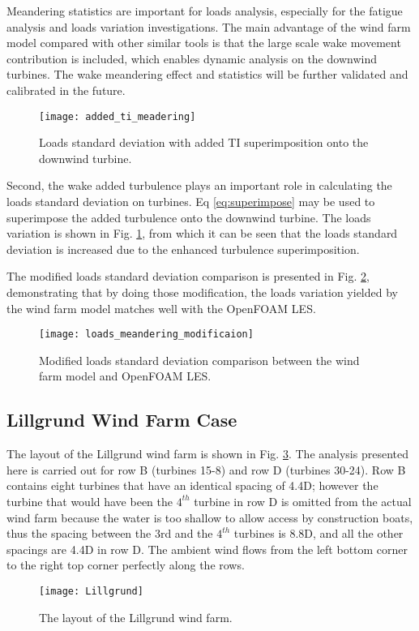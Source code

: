 \documentclass{umthesis}
\begin{document}
Meandering statistics are important for loads analysis, especially for the fatigue analysis and loads variation investigations. The main advantage of the wind farm model compared with other similar tools is that the large scale wake movement contribution is included, which enables dynamic analysis on the downwind turbines. The wake meandering effect and statistics will be further validated and calibrated in the future.

\begin{figure}
  \centering
  \texttt{[image: added\_ti\_meadering]}
  \caption{Loads standard deviation with added TI superimposition onto the downwind turbine.}\label{fig:added_ti_meadering}
\end{figure}

Second, the wake added turbulence plays an important role in calculating the loads standard deviation on turbines. Eq \ref{eq:superimpose} may be used to superimpose the added turbulence onto the downwind turbine. The loads variation is shown in Fig. \ref{fig:added_ti_meadering}, from which it can be seen that the loads standard deviation is increased due to the enhanced turbulence superimposition.

The modified loads standard deviation comparison is presented in Fig. \ref{fig:loads_meandering_modificaion}, demonstrating that by doing those modification, the loads variation yielded by the wind farm model matches well with the OpenFOAM LES.
\begin{figure}
  \centering
  \texttt{[image: loads\_meandering\_modificaion]}
  \caption{Modified loads standard deviation comparison between the wind farm model and OpenFOAM LES.}\label{fig:loads_meandering_modificaion}
\end{figure}



\subsection{Lillgrund Wind Farm Case}
The layout of the Lillgrund wind farm is shown in Fig. \ref{fig:Lillgrund}. The analysis presented here is carried out for row B (turbines 15-8) and row D (turbines 30-24). Row B contains eight turbines that have an identical spacing of 4.4D; however the turbine that would have been the $4^{th}$ turbine in row D is omitted from the actual wind farm because the water is too shallow to allow access by construction boats, thus the spacing between the 3rd and the $4^{th}$ turbines is 8.8D, and all the other spacings are 4.4D in row D. The ambient wind flows from the left bottom corner to the right top corner perfectly along the rows.
\begin{figure}
  \centering
  \texttt{[image: Lillgrund]}
  \caption{The layout of the Lillgrund wind farm.}\label{fig:Lillgrund}
\end{figure}
\end{document}
